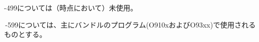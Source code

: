 \begin{hosoku}
-\ttNum499については（\customtoday 時点において）未使用。
\end{hosoku}



\clearpage
\,-\ttNum599については、主にバンドルのプログラム(O910xおよびO93xx)で使用されるものとする。\\

